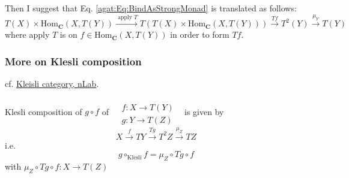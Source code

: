 Then I suggest that Eq. \ref{agat:Eq:BindAsStrongMonad} is translated as follows:
\begin{equation}
T(X) \times \text{Hom}_{\mathbf{C}}(X, T(Y)) \xrightarrow{ \text{ apply } T } T( T(X) \times \text{Hom}_{\mathbf{C}}(X, T(Y))) \xrightarrow{ Tf} T^2(Y) \xrightarrow{ \mu_Y } T(Y) 
\end{equation}
where apply $T$ is on $f\in \text{Hom}_{\mathbf{C}}(X,T(Y))$ in order to form $Tf$.

\subsubsection{More on Klesli composition}

cf. \href{https://ncatlab.org/nlab/show/Kleisli+category}{Kleisli category, nLab}.

\begin{proposition}\label{agat:Prop:KlesliCompositionForm}
	Klesli composition of $g\circ f$ of $\begin{aligned} & \quad \\ 
	& f: X\to T(Y) \\ 
	& g: Y \to T(Z) \end{aligned}$ \, is given by 
	\[
	X \xrightarrow{f} TY \xrightarrow{ Tg} T^2Z \xrightarrow{\mu_Z} TZ 
	\]
	i.e. 
	\begin{equation}
		\boxed{ g \circ_{\text{Klesli}} f = \mu_Z \circ Tg \circ f }
	\end{equation}
	with $ \mu_Z \circ Tg \circ f : X \to T(Z)$
\end{proposition}

